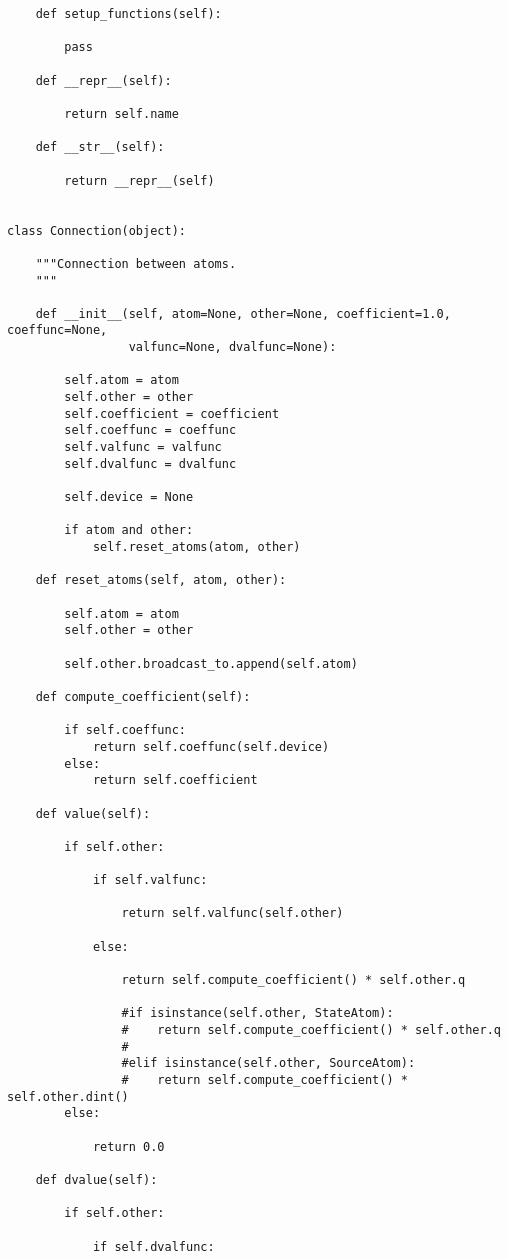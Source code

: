\begin{lstlisting}
    def setup_functions(self):

        pass

    def __repr__(self):

        return self.name

    def __str__(self):

        return __repr__(self)


class Connection(object):

    """Connection between atoms.
    """

    def __init__(self, atom=None, other=None, coefficient=1.0, coeffunc=None,
                 valfunc=None, dvalfunc=None):

        self.atom = atom
        self.other = other
        self.coefficient = coefficient
        self.coeffunc = coeffunc
        self.valfunc = valfunc
        self.dvalfunc = dvalfunc

        self.device = None

        if atom and other:
            self.reset_atoms(atom, other)

    def reset_atoms(self, atom, other):

        self.atom = atom
        self.other = other

        self.other.broadcast_to.append(self.atom)

    def compute_coefficient(self):

        if self.coeffunc:
            return self.coeffunc(self.device)
        else:
            return self.coefficient

    def value(self):

        if self.other:

            if self.valfunc:

                return self.valfunc(self.other)

            else:

                return self.compute_coefficient() * self.other.q

                #if isinstance(self.other, StateAtom):
                #    return self.compute_coefficient() * self.other.q
                #
                #elif isinstance(self.other, SourceAtom):
                #    return self.compute_coefficient() * self.other.dint()
        else:

            return 0.0

    def dvalue(self):

        if self.other:

            if self.dvalfunc:


\end{lstlisting}
